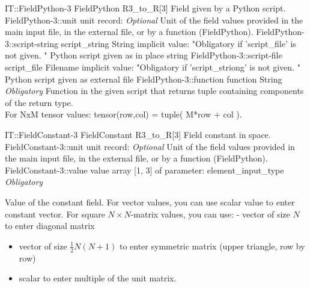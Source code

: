 \begin{RecordType}
	{IT::FieldPython-3}
	{FieldPython}
	{}%
	{}%
	{{{R3{\_}to{\_}R[3] Field given by a Python script.}%
}}
		\RecKey
			{FieldPython-3::unit}
			{unit}
			{{record: }}{}
			{ \it{Optional}}
			{{{Unit of the field values provided in the main input file, in the external file, or by a function (FieldPython).}%
}}
		\RecKey
			{FieldPython-3::script-string}
			{script{\_}string}
			{{String}}{}
			{implicit value: "{Obligatory if 'script{\_}file' is not given. }"}
			{{{Python script given as in place string}%
}}
		\RecKey
			{FieldPython-3::script-file}
			{script{\_}file}
			{{Filename}}{}
			{implicit value: "{Obligatory if 'script{\_}striong' is not given. }"}
			{{{Python script given as external file}%
}}
		\RecKey
			{FieldPython-3::function}
			{function}
			{{String}}{}
			{ \it{Obligatory}}
			{{{Function in the given script that returns tuple containing components of the return type.}\\{
For NxM tensor values: tensor(row,col) = tuple( M*row + col ).}%
}}
\end{RecordType}
\begin{RecordType}
	{IT::FieldConstant-3}
	{FieldConstant}
	{}%
	{}%
	{{{R3{\_}to{\_}R[3] Field constant in space.}%
}}
		\RecKey
			{FieldConstant-3::unit}
			{unit}
			{{record: }}{}
			{ \it{Optional}}
			{{{Unit of the field values provided in the main input file, in the external file, or by a function (FieldPython).}%
}}
		\RecKey
			{FieldConstant-3::value}
			{value}
			{{array [1, 3] of }{parameter: element{\_}input{\_}type}}{}
			{ \it{Obligatory}}
			{{{{Value of the constant field.
For vector values, you can use scalar value to enter constant vector.
For square }{$N\times N$}{-matrix values, you can use:  - vector of size }{$N$}{ to enter diagonal matrix}
% 
}
\begin{itemize}
\item {vector of size }{$\frac12N(N+1)$}{ to enter symmetric matrix (upper triangle, row by row)}
\item {scalar to enter multiple of the unit matrix.}
\end{itemize}
}}
\end{RecordType}
